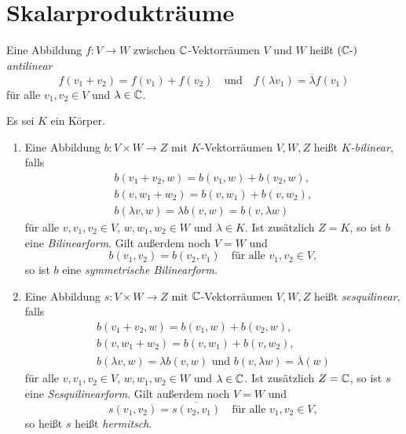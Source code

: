 \section{Skalarprodukträume}


\begin{definition}
  Eine Abbildung $f \colon V \to W$ zwischen $\mathbb{C}$-Vektorräumen $V$ und $W$ heißt \emph{$(\mathbb{C}\text{-})$antilinear}
  \[
    f(v_1 + v_2) = f(v_1) + f(v_2)
    \quad\text{und}\quad
    f(\lambda v_1) = \overline{\lambda} f(v_1)
  \]
  für alle $v_1, v_2 \in V$ und $\lambda \in \mathbb{C}$.
\end{definition}



\begin{definition}
  Es sei $K$ ein Körper.
  \begin{enumerate}[leftmargin=*, label=\roman*)]
    \item
      Eine Abbildung $b \colon V \times W \to Z$ mit $K$-Vektorräumen $V, W, Z$ heißt \emph{$K$-bilinear}, falls
      \begin{gather*}
        b(v_1 + v_2, w) = b(v_1, w) + b(v_2, w), \\
        b(v, w_1 + w_2) = b(v, w_1) + b(v, w_2),  \\
        b(\lambda v, w) = \lambda b(v,w) = b(v, \lambda w)
      \end{gather*}
      für alle $v, v_1, v_2 \in V$, $w, w_1, w_2 \in W$ und $\lambda \in K$.
      Ist zusätzlich $Z = K$, so ist $b$ eine \emph{Bilinearform}.
      Gilt außerdem noch $V = W$ und
      \[
        b(v_1, v_2) = b(v_2, v_1)
        \quad
        \text{für alle $v_1, v_2 \in V$},
      \]
      so ist $b$ eine \emph{symmetrische Bilinearform}.
    \item
      Eine Abbildung $s \colon V \times W \to Z$ mit $\mathbb{C}$-Vektorräumen $V, W, Z$ heißt \emph{sesquilinear}, falls
      \begin{gather*}
        b(v_1 + v_2, w) = b(v_1, w) + b(v_2, w), \\
        b(v, w_1 + w_2) = b(v, w_1) + b(v, w_2),  \\
        b(\lambda v, w) = \lambda b(v,w)
        \text{ und }
        b(v, \lambda w) = \overline{\lambda}(w)
      \end{gather*}
      für alle $v, v_1, v_2 \in V$, $w, w_1, w_2 \in W$ und $\lambda \in \mathbb{C}$.
      Ist zusätzlich $Z = \mathbb{C}$, so ist $s$ eine \emph{Sesquilinearform}.
      Gilt außerdem noch $V = W$ und
      \[
        s(v_1, v_2) = \overline{s(v_2, v_1)}
        \quad
        \text{für alle $v_1, v_2 \in V$},
      \]
      so heißt $s$ heißt \emph{hermitsch}.
  \end{enumerate}
\end{definition}


